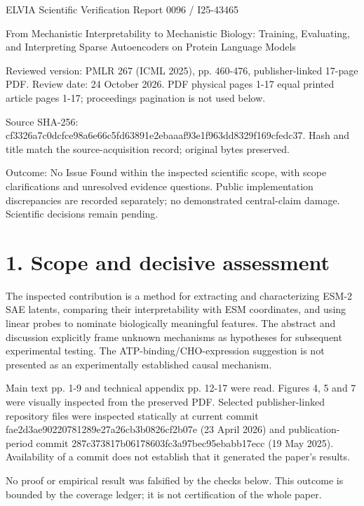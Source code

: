\documentclass[10pt]{article}
\begin{document}
ELVIA Scientific Verification Report
0096 / I25-43465\par
From Mechanistic Interpretability to Mechanistic Biology: Training, Evaluating, and Interpreting Sparse Autoencoders on Protein Language Models\par
Reviewed version: PMLR 267 (ICML 2025), pp. 460-476, publisher-linked 17-page PDF. Review date: 24 October 2026. PDF physical pages 1-17 equal printed article pages 1-17; proceedings pagination is not used below.\par
Source SHA-256: cf3326a7c0dcfce98a6e66c5fd63891e2ebaaaf93e1f963dd8329f169cfedc37. Hash and title match the source-acquisition record; original bytes preserved.\par
Outcome: No Issue Found within the inspected scientific scope, with scope clarifications and unresolved evidence questions. Public implementation discrepancies are recorded separately; no demonstrated central-claim damage. Scientific decisions remain pending.\par
\section*{1. Scope and decisive assessment}
The inspected contribution is a method for extracting and characterizing ESM-2 SAE latents, comparing their interpretability with ESM coordinates, and using linear probes to nominate biologically meaningful features. The abstract and discussion explicitly frame unknown mechanisms as hypotheses for subsequent experimental testing. The ATP-binding/CHO-expression suggestion is not presented as an experimentally established causal mechanism.\par
Main text pp. 1-9 and technical appendix pp. 12-17 were read. Figures 4, 5 and 7 were visually inspected from the preserved PDF. Selected publisher-linked repository files were inspected statically at current commit fae2d3ae90220781289e27a26cb3b0826cf2b07e (23 April 2026) and publication-period commit 287c373817b06178603fc3a97bec95ebabb17ecc (19 May 2025). Availability of a commit does not establish that it generated the paper’s results.\par
No proof or empirical result was falsified by the checks below. This outcome is bounded by the coverage ledger; it is not certification of the whole paper.\par
\end{document}
